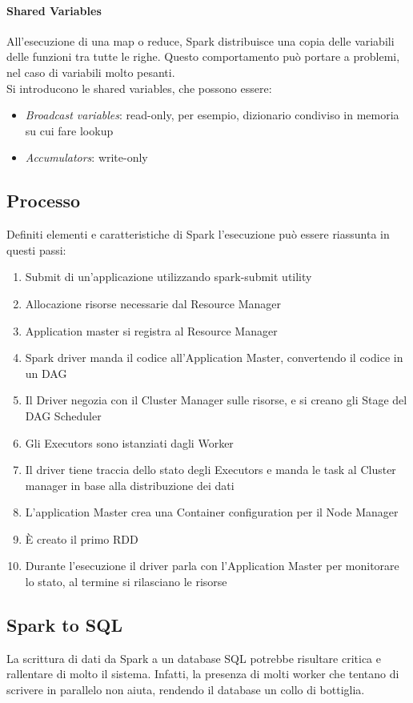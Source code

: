 \paragraph{Shared Variables}
All'esecuzione di una map o reduce, Spark distribuisce una copia delle 
variabili delle funzioni tra tutte le righe. Questo comportamento 
può portare a problemi, nel caso di variabili molto pesanti.\\
Si introducono le shared variables, che possono essere:
\begin{itemize}
    \item \emph{Broadcast variables}: read-only, per esempio, dizionario 
    condiviso in memoria su cui fare lookup
    \item \emph{Accumulators}: write-only
\end{itemize}

\subsection{Processo}
Definiti elementi e caratteristiche di Spark l'esecuzione può essere riassunta 
in questi passi:
\begin{enumerate}
    \item Submit di un'applicazione utilizzando spark-submit utility
    \item Allocazione risorse necessarie dal Resource Manager
    \item Application master si registra al Resource Manager
    \item Spark driver manda il codice all'Application Master, convertendo il codice
    in un DAG
    \item Il Driver negozia con il Cluster Manager sulle risorse, e si creano gli Stage del 
    DAG Scheduler
    \item Gli Executors sono istanziati dagli Worker
    \item Il driver tiene traccia dello stato degli Executors e manda le task al 
    Cluster manager in base alla distribuzione dei dati
    \item L'application Master crea una Container configuration per il Node Manager
    \item È creato il primo RDD
    \item Durante l'esecuzione il driver parla con l'Application Master per monitorare
    lo stato, al termine si rilasciano le risorse
\end{enumerate}

\subsection{Spark to SQL}
La scrittura di dati da Spark a un database SQL potrebbe risultare critica e 
rallentare di molto il sistema. Infatti, la presenza di molti worker che tentano
di scrivere in parallelo non aiuta, rendendo il database un collo di bottiglia.

